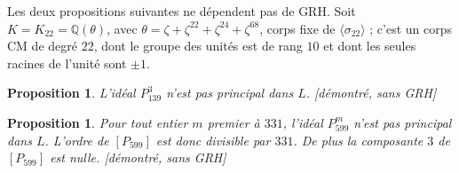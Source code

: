 \documentclass[11pt,a4paper]{amsart}
\theoremstyle{plain}
\newtheorem{proposition}[theoreme]{Proposition}
\theoremstyle{definition}
\numberwithin{equation}{section}
\newcommand{\Q}{\mathbb{Q}}
\newcommand{\st}[1]{\textup{\textsf{\small[#1]}}}
\begin{document}
Les deux propositions suivantes ne dépendent pas de GRH. Soit $K=K_{22}=\Q(\theta)$, avec $\theta=\zeta+\zeta^{22}+\zeta^{24}+\zeta^{68}$, corps fixe de $\langle\sigma_{22}\rangle$ ; c'est un corps CM de degré $22$, dont le groupe des unités est de rang $10$ et dont les seules racines de l'unité sont $\pm1$.

\begin{proposition}\label{prop:classeP139}
L'idéal $P_{139}^3$ n'est pas principal dans $L$. \st{démontré, sans GRH}
\end{proposition}

\begin{proposition}\label{prop:classeP599}
Pour tout entier $m$ premier à $331$, l'idéal $P_{599}^m$ n'est pas principal dans $L$. L'ordre de $[P_{599}]$ est donc divisible par $331$. De plus la composante $3$ de $[P_{599}]$ est nulle. \st{démontré, sans GRH}
\end{proposition}
\end{document}
